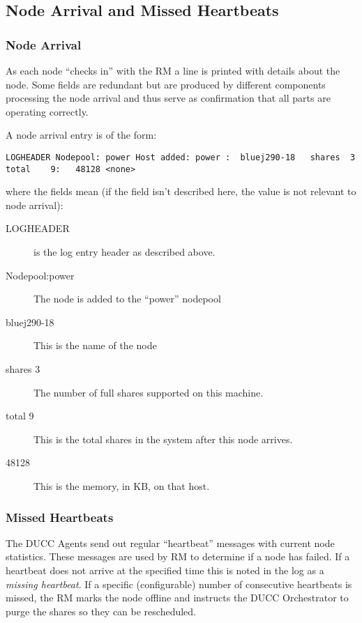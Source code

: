 \subsection{Node Arrival and Missed Heartbeats}
\subsubsection{Node Arrival}
    As each node ``checks in'' with the RM a line is printed with details about the node.  Some fields
    are redundant but are produced by different components processing the node arrival and thus serve
    as confirmation that all parts are operating correctly.

    A node arrival entry is of the form:
\begin{verbatim}
LOGHEADER Nodepool: power Host added: power :  bluej290-18   shares  3 total    9:   48128 <none>
\end{verbatim}
    where the fields mean (if the field isn't described here, the value is not relevant to node arrival):
    \begin{description}
      \item[LOGHEADER] is the log entry header as described above.
      \item[Nodepool:power] The node is added to the ``power'' nodepool
      \item[bluej290-18] This is the name of the node
      \item[shares 3] The number of full shares supported on this machine.
      \item[total 9] This is the total shares in the system after this node arrives.
      \item[48128] This is the memory, in KB, on that host.
    \end{description}

\subsubsection{Missed Heartbeats}
    The DUCC Agents send out regular ``heartbeat'' messages with current node statistics. These
    messages are used by RM to determine if a node has failed.  If a heartbeat does not arrive
    at the specified time this is noted in the log as a {\em missing heartbeat}. If a specific (configurable) number
    of consecutive heartbeats is missed, the RM marks the node offline and instructs the
    DUCC Orchestrator to purge the shares so they can be rescheduled.


